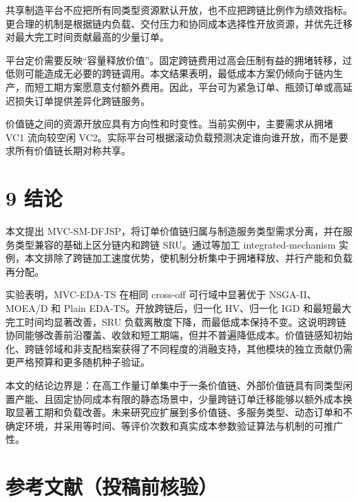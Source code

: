 \documentclass[UTF8,11pt]{ctexart}
\begin{document}
共享制造平台不应把所有同类型资源默认开放，也不应把跨链比例作为绩效指标。更合理的机制是根据链内负载、交付压力和协同成本选择性开放资源，并优先迁移对最大完工时间贡献最高的少量订单。

平台定价需要反映“容量释放价值”。固定跨链费用过高会压制有益的拥堵转移，过低则可能造成无必要的跨链调用。本文结果表明，最低成本方案仍倾向于链内生产，而短工期方案愿意支付额外费用。因此，平台可为紧急订单、瓶颈订单或高延迟损失订单提供差异化跨链服务。

价值链之间的资源开放应具有方向性和时变性。当前实例中，主要需求从拥堵 VC1 流向较空闲 VC2。实际平台可根据滚动负载预测决定谁向谁开放，而不是要求所有价值链长期对称共享。

\section*{9 结论}

本文提出 MVC-SM-DFJSP，将订单价值链归属与制造服务类型需求分离，并在服务类型兼容的基础上区分链内和跨链 SRU。通过等加工 integrated-mechanism 实例，本文排除了跨链加工速度优势，使机制分析集中于拥堵释放、并行产能和负载再分配。

实验表明，MVC-EDA-TS 在相同 cross-off 可行域中显著优于 NSGA-II、MOEA/D 和 Plain EDA-TS。开放跨链后，归一化 HV、归一化 IGD 和最短最大完工时间均显著改善，SRU 负载离散度下降，而最低成本保持不变。这说明跨链协同能够改善前沿覆盖、收敛和短工期端，但并不普遍降低成本。价值链感知初始化、跨链邻域和非支配档案获得了不同程度的消融支持，其他模块的独立贡献仍需更严格预算和更多随机种子验证。

本文的结论边界是：在高工作量订单集中于一条价值链、外部价值链具有同类型闲置产能、且固定协同成本有限的静态场景中，少量跨链订单迁移能够以额外成本换取显著工期和负载改善。未来研究应扩展到多价值链、多服务类型、动态订单和不确定环境，并采用等时间、等评价次数和真实成本参数验证算法与机制的可推广性。

\clearpage
\section*{参考文献（投稿前核验）}
\end{document}
